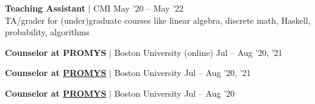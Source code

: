 \resumeProjectHeading
{\textbf{Teaching Assistant} $|$ CMI}
{May '20 -- May '22}\\
\vspace{4pt}
{\color{gray}TA/grader for (under)graduate courses like linear algebra, discrete math, Haskell, probability, algorithms}
\vspace{-15pt}




\resumeProjectHeading
{\textbf{Counselor at PROMYS} $|$ Boston University (online)}
{Jul -- Aug '20, '21}
\vspace{-20pt}

\resumeProjectHeading
{\textbf{Counselor at \href{https://promys.org}{PROMYS}} $|$ Boston University }
{Jul -- Aug '20, '21}
\vspace{-15pt}

\resumeProjectHeading
{\textbf{Counselor at \href{https://promys.org}{PROMYS}} $|$ Boston University }
{Jul -- Aug '20}
\vspace{-5pt}

\resumeSubHeadingListEnd


















%
%
%
%
%
%
%
\vspace{-15pt}













